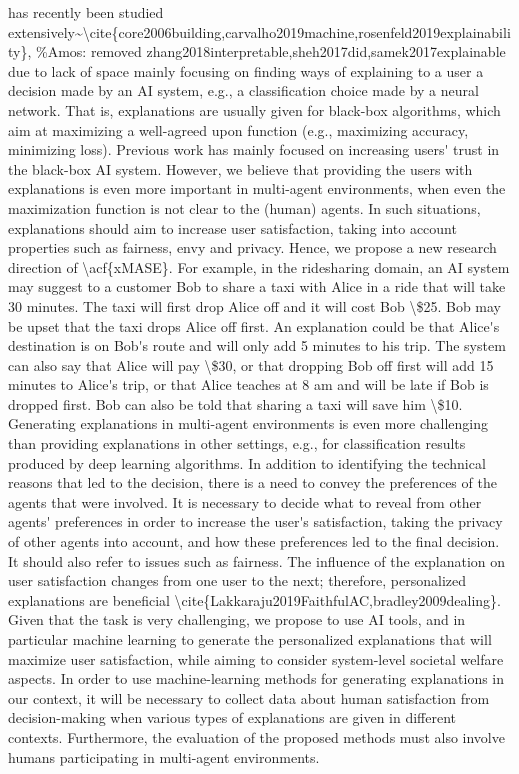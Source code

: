 \documentclass[letterpaper]{article} %
\begin{document}
\ac{ has recently been studied extensively~\cite{core2006building,carvalho2019machine,rosenfeld2019explainability}, %
mainly focusing on finding ways of explaining to a user a decision made by an AI system, e.g., a classification choice made by a neural network. That is, explanations are usually given for black-box algorithms, which aim at maximizing a well-agreed upon function (e.g., maximizing accuracy, minimizing loss). Previous work has mainly focused on increasing users' trust in the black-box AI system. However, we believe that providing the users with explanations is even more important in multi-agent environments, when even the maximization function is not clear to the (human) agents. In such situations, explanations should aim to increase user satisfaction, taking into account properties such as fairness, envy and privacy. Hence, we propose a new research direction of \acf{xMASE}.

For example, in the ridesharing domain, an AI system may suggest to a customer Bob to share a taxi with Alice in a ride that will take 30 minutes.
The taxi will first drop Alice off and it will cost Bob \$25. Bob may be upset that the taxi drops Alice off first. An explanation could be that
Alice's destination is on Bob's route and will only add 5 minutes to his trip. The system can also say that Alice will pay \$30, or that dropping Bob off first will add 15 minutes to Alice's trip, or that Alice teaches at 8 am and will be late if Bob is dropped first. Bob can also be told that sharing a taxi will save him \$10.

Generating explanations in multi-agent environments is even more challenging than providing explanations in other settings, e.g., for classification results produced by deep learning algorithms.
In addition to identifying the technical reasons that led to the decision, there is a need to convey the preferences of the agents that were involved. It is necessary to decide what to reveal from other agents' preferences in order to increase the user's satisfaction, taking the privacy of other agents into account, and how these preferences led to the final decision. It should also refer to issues such as fairness. The influence of the explanation on user satisfaction changes from one user to the next; therefore, personalized explanations are beneficial \cite{Lakkaraju2019FaithfulAC,bradley2009dealing}.
Given that the task is very challenging, we propose to use AI tools, and in particular machine learning to generate the personalized explanations that will maximize user satisfaction, while aiming to consider system-level societal welfare aspects.
In order to use machine-learning methods for generating explanations in our context, it will be necessary to collect data about human satisfaction from decision-making when various types of explanations are given in different contexts. Furthermore, the evaluation of the proposed methods must also involve humans participating in multi-agent environments.

}
\end{document}
